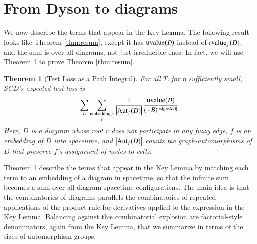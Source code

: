 \documentclass[openany, notitlepage, justified]{tufte-book}
\theoremstyle{plain}
\newtheorem{thm}{Theorem}
\theoremstyle{definition}
\newcommand{\wrap}[1]{\left(#1\right)}
\newcommand{\wabs}[1]{\left|#1\right|}
\newcommand{\Aut}{\text{\textnormal{Aut}}}
\newcommand{\uvalue}{\text{\textnormal{uvalue}}}
\newcommand{\rvalue}{\text{\textnormal{rvalue}}}
\newcommand{\edges}{\text{\textnormal{edges}}}
\newcommand{\parts}{\text{\textnormal{parts}}}
\begin{document}
    \section{From Dyson to diagrams}                             \label{appendix:toward-diagrams}

        We now describe the terms that appear in the Key Lemma.  The following
        result looks like Theorem \ref{thm:resum}, except it has $\uvalue(D)$
        instead of $\rvalue_f(D)$, and the sum is over all diagrams, not just
        irreducible ones.  In fact, we will use Theorem \ref{thm:pathint} to
        prove Theorem \ref{thm:resum}.

        \begin{thm}[Test Loss as a Path Integral] \label{thm:pathint}
            For all $T$: for $\eta$ sufficiently small, SGD's expected test
            loss is
            \begin{equation*}\label{eq:sgdcoef}
                \sum_{D}
                    \sum_{\substack{\text{embeddings}\\f}}
                    \frac{1}{\wabs{\Aut_f(D)}}
                \frac{\uvalue(D)}{(-B)^{|\edges(D)|}}
            \end{equation*}
            Here, $D$ is a diagram whose root $r$ does not participate in
            any fuzzy edge, $f$ is an embedding of $D$ into spacetime, and
            $\wabs{\Aut_f(D)}$ counts the graph-automorphisms of $D$ that
            preserve $f$'s assignment of nodes to cells.
        \end{thm}

        Theorem \ref{thm:pathint} describe the terms that appear in the Key
        Lemma by matching each term to an embedding of a diagram in spacetime,
        so that the infinite sum becomes a sum over all diagram spacetime
        configurations.  The main idea is that the combinatorics of diagrams
        parallels the combinatorics of repeated applications of the product
        rule for derivatives applied to the expression in the Key Lemma.
        Balancing against this combinatorial explosion are factorial-style
        denominators, again from the Key Lemma, that we summarize in terms of
        the sizes of automorphism groups.
\end{document}
